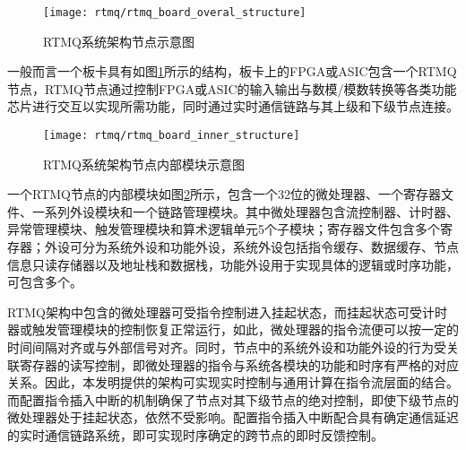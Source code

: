 \begin{figure}
    \centering
    \caption[RTMQ系统架构节点示意图]{RTMQ系统架构节点示意图\label{fig:rtmq_board_overal_structure}}
    \texttt{[image: rtmq/rtmq\_board\_overal\_structure]}
\end{figure}

一般而言一个板卡具有如图\ref{fig:rtmq_board_overal_structure}所示的结构，板卡上的FPGA或ASIC包含一个RTMQ节点，RTMQ节点通过控制FPGA或ASIC的输入输出与数模/模数转换等各类功能芯片进行交互以实现所需功能，同时通过实时通信链路与其上级和下级节点连接。

\begin{figure}
    \centering
    \caption[RTMQ系统架构节点内部模块示意图]{RTMQ系统架构节点内部模块示意图\label{fig:rtmq_board_inner_structure}}
    \texttt{[image: rtmq/rtmq\_board\_inner\_structure]}
\end{figure}

一个RTMQ节点的内部模块如图\ref{fig:rtmq_board_inner_structure}所示，包含一个32位的微处理器、一个寄存器文件、一系列外设模块和一个链路管理模块。其中微处理器包含流控制器、计时器、异常管理模块、触发管理模块和算术逻辑单元5个子模块；寄存器文件包含多个寄存器；外设可分为系统外设和功能外设，系统外设包括指令缓存、数据缓存、节点信息只读存储器以及地址栈和数据栈，功能外设用于实现具体的逻辑或时序功能，可包含多个。

RTMQ架构中包含的微处理器可受指令控制进入挂起状态，而挂起状态可受计时器或触发管理模块的控制恢复正常运行，如此，微处理器的指令流便可以按一定的时间间隔对齐或与外部信号对齐。同时，节点中的系统外设和功能外设的行为受关联寄存器的读写控制，即微处理器的指令与系统各模块的功能和时序有严格的对应关系。因此，本发明提供的架构可实现实时控制与通用计算在指令流层面的结合。
而配置指令插入中断的机制确保了节点对其下级节点的绝对控制，即使下级节点的微处理器处于挂起状态，依然不受影响。配置指令插入中断配合具有确定通信延迟的实时通信链路系统，即可实现时序确定的跨节点的即时反馈控制。

